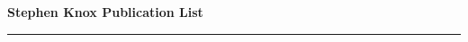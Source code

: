 \documentclass[11pt]{article}
\newcommand{\makeheading}[1]%
        {\hspace*{-\marginparsep minus \marginparwidth}%
         \begin{minipage}[t]{\textwidth+\marginparwidth+\marginparsep}%
                {\large \bfseries #1}\\[-0.15\baselineskip]%
                 \rule{\columnwidth}{1pt}%
         \end{minipage}}
\begin{document}
\makeheading{Stephen Knox Publication List}
\nocite{knox2015open}
\nocite{knox2014iemss}
\nocite{meier2014iemss}
\nocite{konur2014formal}
\nocite{knox2010cbr}
\nocite{Stevenson2009ontonym}
\nocite{ScatterboxRIA2008}
\nocite{Knox:2007:Towards-Scatter}
\nocite{Dobson:2007:A-first-approac}
\nocite{Coyle2007Proposed}
\nocite{Clear2006Integrating}



\end{document}
